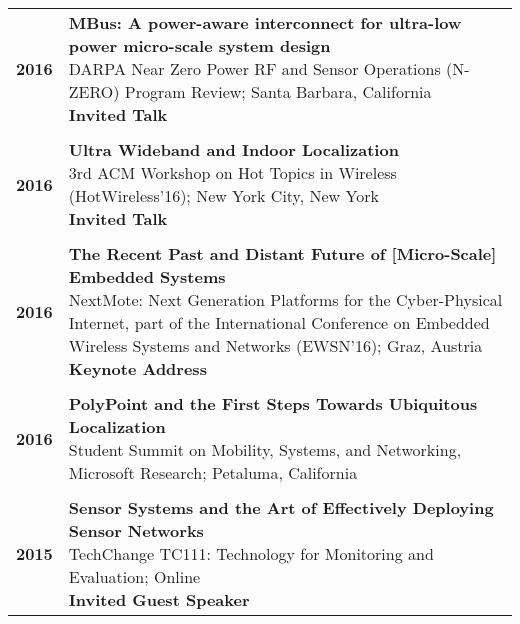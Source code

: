 \documentclass{article}
\begin{document}
\begin{longtable}{>{\bf}p{1cm} l}
  \\

  2016 & \makecell {
    \textbf{MBus: A power-aware interconnect for ultra-low power micro-scale system design} \\
    DARPA Near Zero Power RF and Sensor Operations (N-ZERO) Program Review; Santa Barbara, California \\
    \textbf{\color{BrickRed} Invited Talk} \\
  } \\

  \\

  2016 & \makecell{
    \textbf{Ultra Wideband and Indoor Localization} \\
    3rd ACM Workshop on Hot Topics in Wireless (HotWireless'16); New York City, New York \\
    \textbf{\color{BrickRed} Invited Talk}
  } \\

  \\

  2016 & \makecell{
    \textbf{The Recent Past and Distant Future of [Micro-Scale] Embedded Systems} \\
    NextMote: Next Generation Platforms for the Cyber-Physical Internet, part of the International Conference on Embedded Wireless Systems and Networks (EWSN'16); Graz, Austria \\
    \textbf{\color{BrickRed} Keynote Address} \\
  } \\

  \\

  2016 & \makecell{
    \textbf{PolyPoint and the First Steps Towards Ubiquitous Localization} \\
    Student Summit on Mobility, Systems, and Networking, Microsoft Research; Petaluma, California \\
  } \\

  \\

  2015 & \makecell{
    \textbf{Sensor Systems and the Art of Effectively Deploying Sensor Networks} \\
    TechChange TC111: Technology for Monitoring and Evaluation; Online \\
    \textbf{\color{BrickRed} Invited Guest Speaker} \\
  } \\


\end{longtable}
\end{document}
